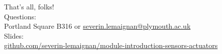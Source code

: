 \documentclass[compress]{beamer}
\begin{document}
\begin{frame}{}
    \begin{center}
        \Large
        That's all, folks!\\[2em]
        \normalsize
        Questions:\\
        Portland Square B316 or \url{severin.lemaignan@plymouth.ac.uk} \\[1em]

        Slides:\\
        \href{https://github.com/severin-lemaignan/module-mobile-and-humanoid-robots}{\small
        github.com/severin-lemaignan/module-introduction-sensors-actuators}


    \end{center}
\end{frame}
\end{document}

